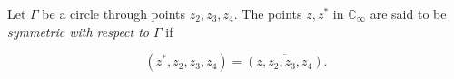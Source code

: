 Let $\Gamma$ be a circle through points $z_2, z_3, z_4$. The points $z, z^*$ in $\mathbb{C}_\infty$ are said to be \textit{symmetric with respect to $\Gamma$} if

$$\left(z^*, z_2, z_3, z_4\right) = \overline{\left(z, z_2, z_3, z_4\right)}.$$
